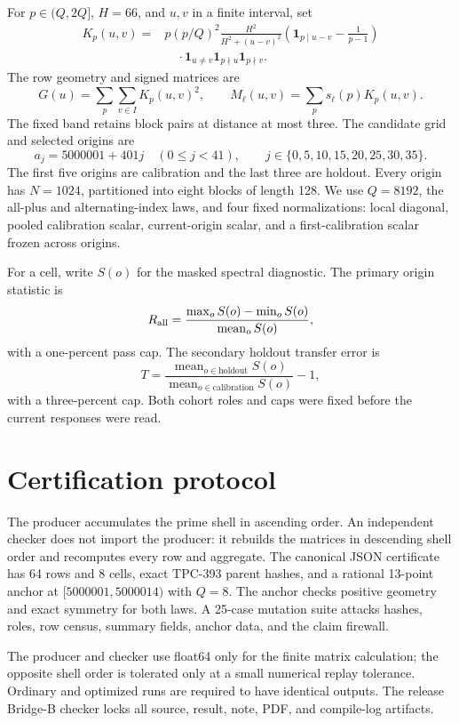 \documentclass[10pt]{article}
\begin{document}
For $p\in(Q,2Q]$, $H=66$, and $u,v$ in a finite interval, set
\begin{align*}
 K_p(u,v)={}&p(p/Q)^2\frac{H^2}{H^2+(u-v)^2}
 \left(\mathbf 1_{p\mid u-v}-\frac{1}{p-1}\right)\\
 &\quad\cdot\mathbf 1_{u\ne v}\mathbf 1_{p\nmid u}\mathbf 1_{p\nmid v}.
\end{align*}
The row geometry and signed matrices are
\[
 G(u)=\sum_p\sum_{v\in I}K_p(u,v)^2,
 \qquad M_\ell(u,v)=\sum_p s_\ell(p)K_p(u,v).
\]
The fixed band retains block pairs at distance at most three.  The candidate
grid and selected origins are
\[
 a_j=5000001+401j\quad(0\leq j<41),
 \qquad j\in\{0,5,10,15,20,25,30,35\}.
\]
The first five origins are calibration and the last three are holdout.  Every
origin has $N=1024$, partitioned into eight blocks of length 128.  We use
$Q=8192$, the all-plus and alternating-index laws, and four fixed
normalizations: local diagonal, pooled calibration scalar, current-origin
scalar, and a first-calibration scalar frozen across origins.

For a cell, write $S(o)$ for the masked spectral diagnostic.  The primary
origin statistic is
\[
 R_{\rm all}=\frac{\max_o S(o)-\min_o S(o)}{\operatorname{mean}_o S(o)},
\]
with a one-percent pass cap.  The secondary holdout transfer error is
\[
 T=\frac{\operatorname{mean}_{o\in\mathrm{holdout}}S(o)}
 {\operatorname{mean}_{o\in\mathrm{calibration}}S(o)}-1,
\]
with a three-percent cap.  Both cohort roles and caps were fixed before the
current responses were read.

\section{Certification protocol}

The producer accumulates the prime shell in ascending order.  An independent
checker does not import the producer: it rebuilds the matrices in descending
shell order and recomputes every row and aggregate.  The canonical JSON
certificate has 64 rows and 8 cells, exact TPC-393 parent hashes, and a
rational 13-point anchor at $[5000001,5000014)$ with $Q=8$.  The anchor checks
positive geometry and exact symmetry for both laws.  A 25-case mutation suite
attacks hashes, roles, row census, summary fields, anchor data, and the claim
firewall.

The producer and checker use float64 only for the finite matrix calculation;
the opposite shell order is tolerated only at a small numerical replay
tolerance.  Ordinary and optimized runs are required to have identical
outputs.  The release Bridge-B checker locks all source, result, note, PDF,
and compile-log artifacts.
\end{document}
